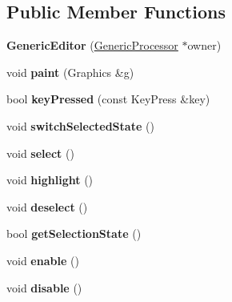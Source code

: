 \subsection*{Public Member Functions}
\begin{DoxyCompactItemize}
\item 
\hypertarget{classGenericEditor_a2e9634ca6753f1f4729cb8cc1b1e1757}{{\bfseries Generic\-Editor} (\hyperlink{classGenericProcessor}{Generic\-Processor} $\ast$owner)}\label{classGenericEditor_a2e9634ca6753f1f4729cb8cc1b1e1757}

\item 
\hypertarget{classGenericEditor_a6da2cb554793f7c24919ca0d3a860807}{void {\bfseries paint} (Graphics \&g)}\label{classGenericEditor_a6da2cb554793f7c24919ca0d3a860807}

\item 
\hypertarget{classGenericEditor_a1d95f3fa72eff3aca781736951052dd9}{bool {\bfseries key\-Pressed} (const Key\-Press \&key)}\label{classGenericEditor_a1d95f3fa72eff3aca781736951052dd9}

\item 
\hypertarget{classGenericEditor_adf3039a522fd423bb090ab31041748fe}{void {\bfseries switch\-Selected\-State} ()}\label{classGenericEditor_adf3039a522fd423bb090ab31041748fe}

\item 
\hypertarget{classGenericEditor_a6b2fc0a74e858b94cefa70fd6c2dfbf9}{void {\bfseries select} ()}\label{classGenericEditor_a6b2fc0a74e858b94cefa70fd6c2dfbf9}

\item 
\hypertarget{classGenericEditor_a0d24085ae8fd1b230c028495f47f5d33}{void {\bfseries highlight} ()}\label{classGenericEditor_a0d24085ae8fd1b230c028495f47f5d33}

\item 
\hypertarget{classGenericEditor_ab81335b8bae46480ffbfc6d3a049ce76}{void {\bfseries deselect} ()}\label{classGenericEditor_ab81335b8bae46480ffbfc6d3a049ce76}

\item 
\hypertarget{classGenericEditor_af8c36ade567c70457ff8b9034ed3a5a0}{bool {\bfseries get\-Selection\-State} ()}\label{classGenericEditor_af8c36ade567c70457ff8b9034ed3a5a0}

\item 
\hypertarget{classGenericEditor_a5218e677eba574ad85c70004ff4ef089}{void {\bfseries enable} ()}\label{classGenericEditor_a5218e677eba574ad85c70004ff4ef089}

\item 
\hypertarget{classGenericEditor_a03f6eb4b700a70d1b9c93353105430cf}{void {\bfseries disable} ()}\label{classGenericEditor_a03f6eb4b700a70d1b9c93353105430cf}


\end{DoxyCompactItemize}
